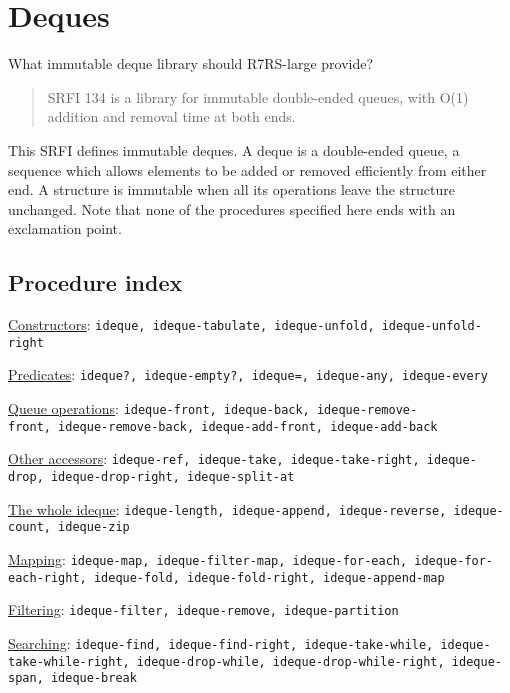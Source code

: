 \section{Deques}
 What immutable deque library should R7RS-large provide?

\begin{quote}
SRFI 134 is a library for immutable double-ended queues, with O(1)
addition and removal time at both ends.
\end{quote}

This SRFI defines immutable deques. A deque is a double-ended queue, a
sequence which allows elements to be added or removed efficiently from
either end. A structure is immutable when all its operations leave the
structure unchanged. Note that none of the 
procedures specified here ends with an exclamation point.


\subsection{Procedure index}\label{procedure-index}

\protect\hyperlink{Constructors}{Constructors}:
\texttt{ideque,\ ideque-tabulate,\ ideque-unfold,\ ideque-unfold-right}

\protect\hyperlink{Predicates}{Predicates}:
\texttt{ideque?,\ ideque-empty?,\ ideque=,\ ideque-any,\ ideque-every}

\protect\hyperlink{Queueoperations}{Queue operations}:
\texttt{ideque-front,\ ideque-back,\ ideque-remove-front,\ ideque-remove-back,\ ideque-add-front,\ ideque-add-back}

\protect\hyperlink{Otheraccessors}{Other accessors}:
\texttt{ideque-ref,\ ideque-take,\ ideque-take-right,\ ideque-drop,\ ideque-drop-right,\ ideque-split-at}

\protect\hyperlink{Thewholedeque}{The whole ideque}:
\texttt{ideque-length,\ ideque-append,\ ideque-reverse,\ ideque-count,\ ideque-zip}

\protect\hyperlink{Mapping}{Mapping}:
\texttt{ideque-map,\ ideque-filter-map,\ ideque-for-each,\ ideque-for-each-right,\ ideque-fold,\ ideque-fold-right,\ ideque-append-map}

\protect\hyperlink{Filtering}{Filtering}:
\texttt{ideque-filter,\ ideque-remove,\ ideque-partition}

\protect\hyperlink{Searching}{Searching}:
\texttt{ideque-find,\ ideque-find-right,\ ideque-take-while,\ ideque-take-while-right,\ ideque-drop-while,\ ideque-drop-while-right,\ ideque-span,\ ideque-break}

